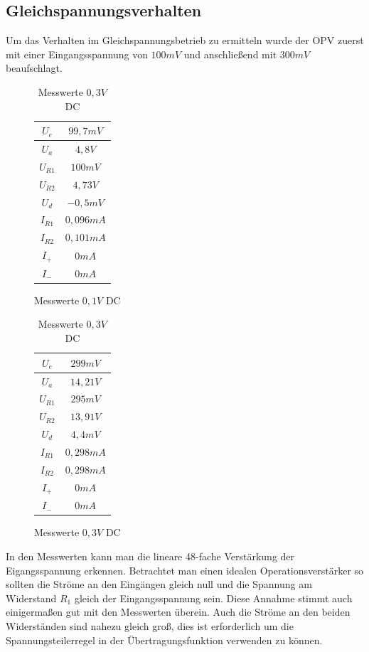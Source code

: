 \subsection{Gleichspannungsverhalten}

Um das Verhalten im Gleichspannungsbetrieb zu ermitteln wurde der OPV zuerst mit einer Eingangsspannung von $100mV$ und anschließend
mit $300mV$ beaufschlagt.\\

\begin{table}[H]
\begin{minipage}{.5\textwidth}
\begin{figure}[H]
\centering
 \begin{tabular}{c|c}
  $U_e$ & $99,7mV$ \\ \hline
  $U_a$ & $4,8V$ \\ \hline
  $U_{R1}$ & $100mV$ \\ \hline
  $U_{R2}$ & $4,73V$ \\ \hline
  $U_d$ & $-0,5mV$ \\ \hline
  $I_{R1}$ & $0,096mA$ \\ \hline
  $I_{R2}$ & $0,101mA$ \\ \hline
  $I_+$ & $0mA$ \\ \hline
  $I_-$ & $0mA$ \\
 \end{tabular}
  \caption{Messwerte $0,1V$ DC}
\end{figure}
\end{minipage}
\begin{minipage}{.5\textwidth}
\begin{figure}[H]
  \centering
 \begin{tabular}{c|c}
  $U_e$ & $299mV$ \\ \hline
  $U_a$ & $14,21V$ \\ \hline
  $U_{R1}$ & $295mV$ \\ \hline
  $U_{R2}$ & $13,91V$ \\ \hline
  $U_d$ & $4,4mV$ \\ \hline
  $I_{R1}$ & $0,298mA$ \\ \hline
  $I_{R2}$ & $0,298mA$ \\ \hline
  $I_+$ & $0mA$ \\ \hline
  $I_-$ & $0mA$ \\
 \end{tabular}
 \caption{Messwerte $0,3V$ DC}
\end{figure}
\end{minipage}
\end{table}
\noindent
In den Messwerten kann man die lineare 48-fache Verstärkung der Eigangsspannung erkennen. Betrachtet man einen
idealen Operationsverstärker so sollten die Ströme an den Eingängen gleich null und die Spannung am Widerstand $R_1$
gleich der Eingangsspannung sein. Diese Annahme stimmt auch einigermaßen gut mit den Messwerten überein. Auch die Ströme an den
beiden Widerständen sind nahezu gleich groß, dies ist erforderlich um die Spannungsteilerregel in der Übertragungsfunktion
verwenden zu können.\\

